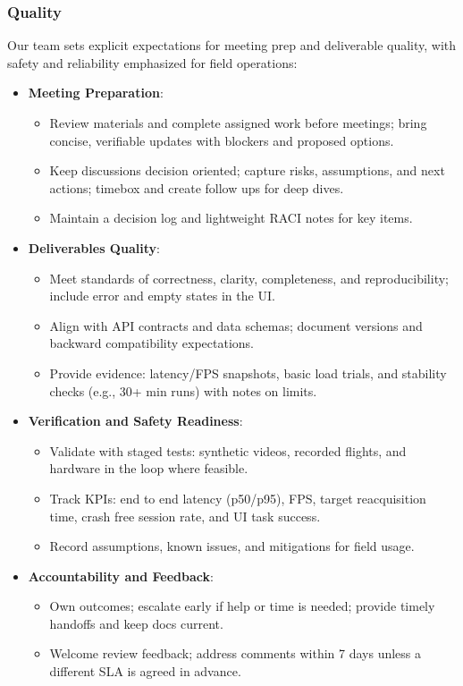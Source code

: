 \documentclass{article}
\begin{document}
\subsubsection*{\color{blue}Quality}

Our team sets explicit expectations for meeting prep and deliverable quality,
with safety and reliability emphasized for field operations:

\begin{itemize}
  \item \textbf{Meeting Preparation}:
    \begin{itemize}
      \item Review materials and complete assigned work before meetings; bring
        concise, verifiable updates with blockers and proposed options.
      \item Keep discussions decision oriented; capture risks, assumptions, and
        next actions; timebox and create follow ups for deep dives.
      \item Maintain a decision log and lightweight RACI notes for key items.
    \end{itemize}

  \item \textbf{Deliverables Quality}:
    \begin{itemize}
      \item Meet standards of correctness, clarity, completeness, and
        reproducibility; include error and empty states in the UI.
      \item Align with API contracts and data schemas; document versions and
        backward compatibility expectations.
      \item Provide evidence: latency/FPS snapshots, basic load trials, and
        stability checks (e.g., 30+ min runs) with notes on limits.
    \end{itemize}

  \item \textbf{Verification and Safety Readiness}:
    \begin{itemize}
      \item Validate with staged tests: synthetic videos, recorded flights, and
        hardware in the loop where feasible.
      \item Track KPIs: end to end latency (p50/p95), FPS, target reacquisition
        time, crash free session rate, and UI task success.
      \item Record assumptions, known issues, and mitigations for field usage.
    \end{itemize}

  \item \textbf{Accountability and Feedback}:
    \begin{itemize}
      \item Own outcomes; escalate early if help or time is needed; provide
        timely handoffs and keep docs current.
      \item Welcome review feedback; address comments within 7 days unless a
        different SLA is agreed in advance.
    \end{itemize}

\end{itemize}
\end{document}
